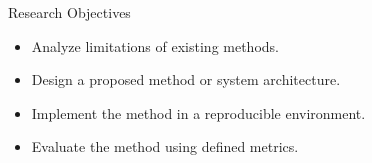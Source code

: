 \begin{frame}{Research Objectives}

\begin{itemize}
    \item Analyze limitations of existing methods.
    \item Design a proposed method or system architecture.
    \item Implement the method in a reproducible environment.
    \item Evaluate the method using defined metrics.
\end{itemize}

\end{frame}

